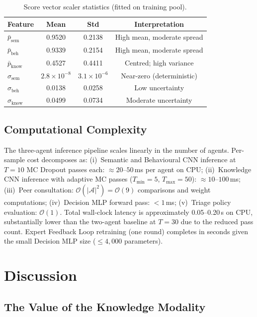 \begin{table}[h]
\centering
\caption{Score vector scaler statistics (fitted on training pool).}
\label{tab:tifs_scaler}
\begin{tabular}{lccc}
\toprule
\textbf{Feature} & \textbf{Mean} & \textbf{Std} & \textbf{Interpretation} \\
\midrule
$\bar{p}_\text{sem}$  & 0.9520 & 0.2138 & High mean, moderate spread \\
$\bar{p}_\text{beh}$  & 0.9339 & 0.2154 & High mean, moderate spread \\
$\bar{p}_\text{know}$ & 0.4527 & 0.4411 & Centred; high variance \\
$\sigma_\text{sem}$   & $2.8\!\times\!10^{-8}$ & $3.1\!\times\!10^{-6}$ & Near-zero (deterministic) \\
$\sigma_\text{beh}$   & 0.0138 & 0.0258 & Low uncertainty \\
$\sigma_\text{know}$  & 0.0499 & 0.0734 & Moderate uncertainty \\
\bottomrule
\end{tabular}
\end{table}

\subsection{Computational Complexity}

The three-agent inference pipeline scales linearly in the number of agents. Per-sample cost decomposes as: (i)~Semantic and Behavioural CNN inference at $T = 10$ MC Dropout passes each: $\approx 20$--$50$\,ms per agent on CPU; (ii)~Knowledge CNN inference with adaptive MC passes ($T_\text{min} = 5$, $T_\text{max} = 50$): $\approx 10$--$100$\,ms; (iii)~Peer consultation: $\mathcal{O}(|\mathcal{A}|^2) = \mathcal{O}(9)$ comparisons and weight computations; (iv)~Decision MLP forward pass: $<1$\,ms; (v)~Triage policy evaluation: $\mathcal{O}(1)$. Total wall-clock latency is approximately 0.05--0.20\,s on CPU, substantially lower than the two-agent baseline at $T = 30$ due to the reduced pass count. Expert Feedback Loop retraining (one round) completes in seconds given the small Decision MLP size ($\leq 4{,}000$ parameters).


\section{Discussion}
\label{sec:tifs_discussion}

\subsection{The Value of the Knowledge Modality}

